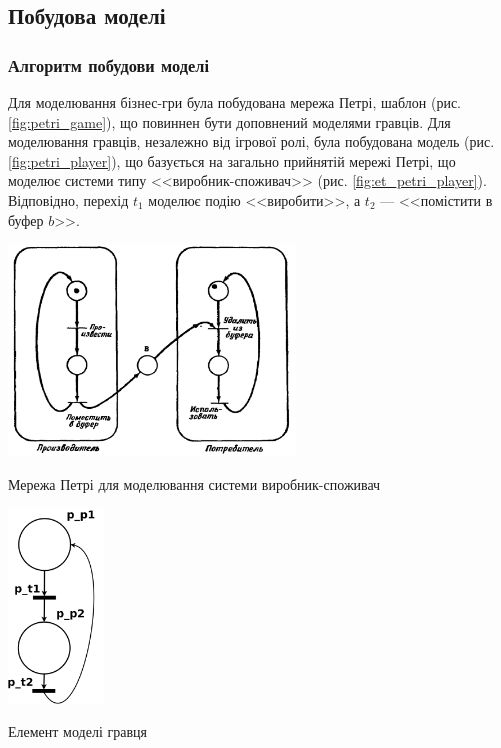 \subsection{Побудова моделі}
\subsubsection{Алгоритм побудови моделі}
Для моделювання бізнес-гри була побудована мережа Петрі, шаблон (рис. \ref{fig:petri_game}), що повиннен бути доповнений моделями гравців. Для моделювання гравців, незалежно від ігрової ролі, була побудована модель (рис. \ref{fig:petri_player}), що базується на загально прийнятій мережі Петрі, що моделює системи типу <<виробник-споживач>> (рис. \ref{fig:et_petri_player}). Відповідно, перехід $t_1$ моделює подію <<виробити>>, а $t_2$ --- <<помістити в буфер $b$>>.
\begin{stdfigure}  
    \includegraphics[width=3in]{images/et_prod_cons.png}
    \caption{Мережа Петрі для моделювання системи виробник-споживач}
    \label{fig:et_petri_player}
\end{stdfigure}
 
\begin{stdfigure}  
    \includegraphics[width=1in]{images/prod_cons.png}
    \caption{Елемент моделі гравця}
    \label{fig:petri_player}
\end{stdfigure}

